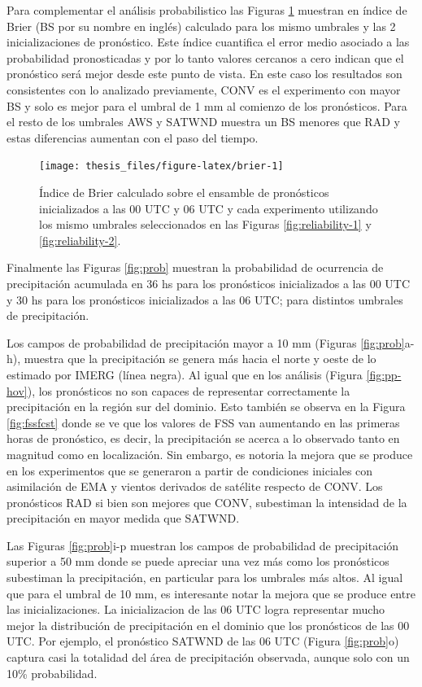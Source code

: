 \documentclass[12pt,oneside,a4paper]{reedthesis}
\begin{document}
Para complementar el análisis probabilistico las Figuras \ref{fig:brier} muestran en índice de Brier (BS por su nombre en inglés) calculado para los mismo umbrales y las 2 inicializaciones de pronóstico. Este índice cuantifica el error medio asociado a las probabilidad pronosticadas y por lo tanto valores cercanos a cero indican que el pronóstico será mejor desde este punto de vista. En este caso los resultados son consistentes con lo analizado previamente, CONV es el experimento con mayor BS y solo es mejor para el umbral de 1 mm al comienzo de los pronósticos. Para el resto de los umbrales AWS y SATWND muestra un BS menores que RAD y estas diferencias aumentan con el paso del tiempo.


\begin{figure}

\texttt{[image: thesis\_files/figure-latex/brier-1]} \hfill{}

\caption{Índice de Brier calculado sobre el ensamble de pronósticos inicializados a las 00 UTC y 06 UTC y cada experimento utilizando los mismo umbrales seleccionados en las Figuras \ref{fig:reliability-1} y \ref{fig:reliability-2}.}\label{fig:brier}
\end{figure}
Finalmente las Figuras \ref{fig:prob} muestran la probabilidad de ocurrencia de precipitación acumulada en 36 hs para los pronósticos inicializados a las 00 UTC y 30 hs para los pronósticos inicializados a las 06 UTC; para distintos umbrales de precipitación.

Los campos de probabilidad de precipitación mayor a 10 mm (Figuras \ref{fig:prob}a-h), muestra que la precipitación se genera más hacia el norte y oeste de lo estimado por IMERG (línea negra). Al igual que en los análisis (Figura \ref{fig:pp-hov}), los pronósticos no son capaces de representar correctamente la precipitación en la región sur del dominio. Esto también se observa en la Figura \ref{fig:fssfcst} donde se ve que los valores de FSS van aumentando en las primeras horas de pronóstico, es decir, la precipitación se acerca a lo observado tanto en magnitud como en localización. Sin embargo, es notoria la mejora que se produce en los experimentos que se generaron a partir de condiciones iniciales con asimilación de EMA y vientos derivados de satélite respecto de CONV. Los pronósticos RAD si bien son mejores que CONV, subestiman la intensidad de la precipitación en mayor medida que SATWND.

Las Figuras \ref{fig:prob}i-p muestran los campos de probabilidad de precipitación superior a 50 mm donde se puede apreciar una vez más como los pronósticos subestiman la precipitación, en particular para los umbrales más altos. Al igual que para el umbral de 10 mm, es interesante notar la mejora que se produce entre las inicializaciones. La inicializacion de las 06 UTC logra representar mucho mejor la distribución de precipitación en el dominio que los pronósticos de las 00 UTC. Por ejemplo, el pronóstico SATWND de las 06 UTC (Figura \ref{fig:prob}o) captura casi la totalidad del área de precipitación observada, aunque solo con un 10\% probabilidad.
\end{document}

